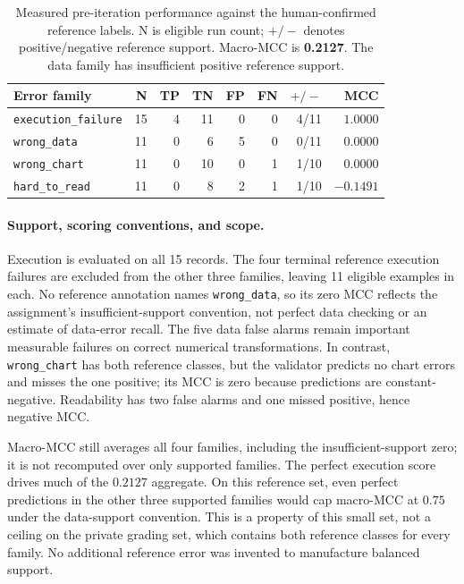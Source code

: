 \documentclass[11pt]{article}
\begin{document}
\begin{table}[htbp]
\centering
\small
\begin{tabular}{lrrrrrrr}
\toprule
Error family & N & TP & TN & FP & FN & $+/-$ & MCC \\
\midrule
\texttt{execution\_failure} & 15 & 4 & 11 & 0 & 0 & 4/11 & $1.0000$ \\
\texttt{wrong\_data} & 11 & 0 & 6 & 5 & 0 & 0/11 & $0.0000$ \\
\texttt{wrong\_chart} & 11 & 0 & 10 & 0 & 1 & 1/10 & $0.0000$ \\
\texttt{hard\_to\_read} & 11 & 0 & 8 & 2 & 1 & 1/10 & $-0.1491$ \\
\bottomrule
\end{tabular}
\caption{Measured pre-iteration performance against the human-confirmed
reference labels. N is eligible run count; $+/-$ denotes positive/negative
reference support. Macro-MCC is \textbf{0.2127}.
The data family has insufficient positive reference support.}
\label{tab:authored-pre}
\end{table}

\paragraph{Support, scoring conventions, and scope.}
Execution is evaluated on all 15 records.
The four terminal reference execution failures are excluded from the
other three families, leaving 11 eligible examples in each.
No reference annotation names \texttt{wrong\_data}, so its zero MCC
reflects the assignment's insufficient-support convention, not perfect
data checking or an estimate of data-error recall.
The five data false alarms remain important measurable failures on correct
numerical transformations.
In contrast, \texttt{wrong\_chart} has both reference classes, but the
validator predicts no chart errors and misses the one positive; its MCC
is zero because predictions are constant-negative.
Readability has two false alarms and one missed positive, hence negative MCC.

Macro-MCC still averages all four families, including the
insufficient-support zero; it is not recomputed over only supported families.
The perfect execution score drives much of the $0.2127$ aggregate.
On this reference set, even perfect predictions in the other three supported
families would cap macro-MCC at $0.75$ under the data-support convention.
This is a property of this small set, not a ceiling on the private grading
set, which contains both reference classes for every family.
No additional reference error was invented to manufacture balanced support.
\end{document}

